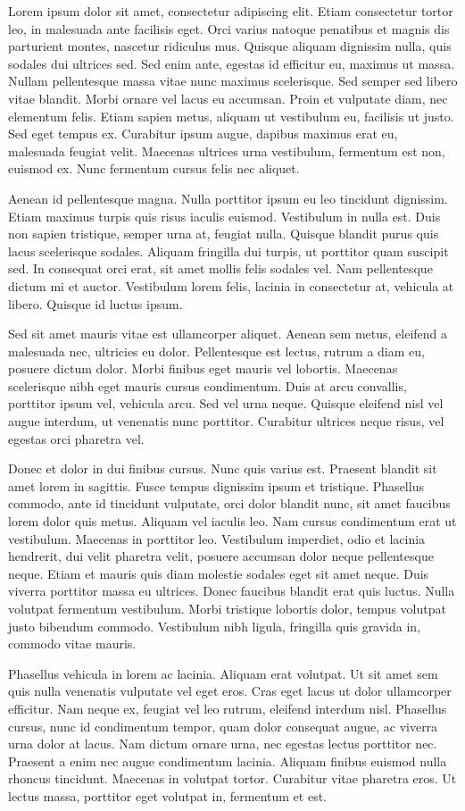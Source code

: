 Lorem ipsum dolor sit amet, consectetur adipiscing elit. Etiam consectetur tortor leo, in malesuada ante facilisis eget. Orci varius natoque penatibus et magnis dis parturient montes, nascetur ridiculus mus. Quisque aliquam dignissim nulla, quis sodales dui ultrices sed. Sed enim ante, egestas id efficitur eu, maximus ut massa. Nullam pellentesque massa vitae nunc maximus scelerisque. Sed semper sed libero vitae blandit. Morbi ornare vel lacus eu accumsan. Proin et vulputate diam, nec elementum felis. Etiam sapien metus, aliquam ut vestibulum eu, facilisis ut justo. Sed eget tempus ex. Curabitur ipsum augue, dapibus maximus erat eu, malesuada feugiat velit. Maecenas ultrices urna vestibulum, fermentum est non, euismod ex. Nunc fermentum cursus felis nec aliquet.

Aenean id pellentesque magna. Nulla porttitor ipsum eu leo tincidunt dignissim. Etiam maximus turpis quis risus iaculis euismod. Vestibulum in nulla est. Duis non sapien tristique, semper urna at, feugiat nulla. Quisque blandit purus quis lacus scelerisque sodales. Aliquam fringilla dui turpis, ut porttitor quam suscipit sed. In consequat orci erat, sit amet mollis felis sodales vel. Nam pellentesque dictum mi et auctor. Vestibulum lorem felis, lacinia in consectetur at, vehicula at libero. Quisque id luctus ipsum.

Sed sit amet mauris vitae est ullamcorper aliquet. Aenean sem metus, eleifend a malesuada nec, ultricies eu dolor. Pellentesque est lectus, rutrum a diam eu, posuere dictum dolor. Morbi finibus eget mauris vel lobortis. Maecenas scelerisque nibh eget mauris cursus condimentum. Duis at arcu convallis, porttitor ipsum vel, vehicula arcu. Sed vel urna neque. Quisque eleifend nisl vel augue interdum, ut venenatis nunc porttitor. Curabitur ultrices neque risus, vel egestas orci pharetra vel.

Donec et dolor in dui finibus cursus. Nunc quis varius est. Praesent blandit sit amet lorem in sagittis. Fusce tempus dignissim ipsum et tristique. Phasellus commodo, ante id tincidunt vulputate, orci dolor blandit nunc, sit amet faucibus lorem dolor quis metus. Aliquam vel iaculis leo. Nam cursus condimentum erat ut vestibulum. Maecenas in porttitor leo. Vestibulum imperdiet, odio et lacinia hendrerit, dui velit pharetra velit, posuere accumsan dolor neque pellentesque neque. Etiam et mauris quis diam molestie sodales eget sit amet neque. Duis viverra porttitor massa eu ultrices. Donec faucibus blandit erat quis luctus. Nulla volutpat fermentum vestibulum. Morbi tristique lobortis dolor, tempus volutpat justo bibendum commodo. Vestibulum nibh ligula, fringilla quis gravida in, commodo vitae mauris.

Phasellus vehicula in lorem ac lacinia. Aliquam erat volutpat. Ut sit amet sem quis nulla venenatis vulputate vel eget eros. Cras eget lacus ut dolor ullamcorper efficitur. Nam neque ex, feugiat vel leo rutrum, eleifend interdum nisl. Phasellus cursus, nunc id condimentum tempor, quam dolor consequat augue, ac viverra urna dolor at lacus. Nam dictum ornare urna, nec egestas lectus porttitor nec. Praesent a enim nec augue condimentum lacinia. Aliquam finibus euismod nulla rhoncus tincidunt. Maecenas in volutpat tortor. Curabitur vitae pharetra eros. Ut lectus massa, porttitor eget volutpat in, fermentum et est.